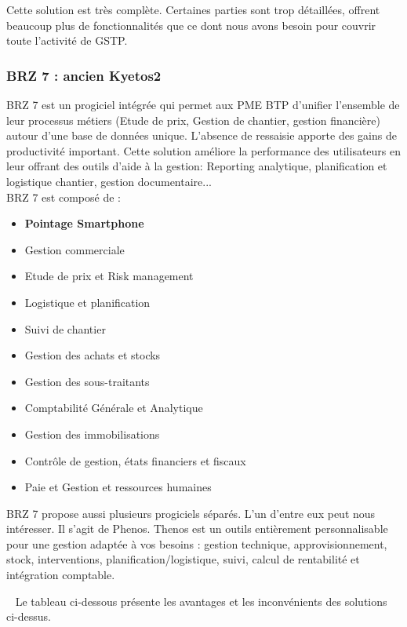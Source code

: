 		Cette solution est très complète. Certaines parties sont trop détaillées, offrent beaucoup plus de fonctionnalités que ce dont nous avons besoin pour couvrir toute l'activité de GSTP.
			
		\subsubsection{BRZ 7 : ancien Kyetos2}
		
		BRZ 7 est un progiciel intégrée qui permet aux PME BTP d'unifier l'ensemble de leur processus métiers (Etude de prix, Gestion de chantier, gestion financière) autour d'une base de données unique. 
    L'absence de ressaisie apporte des gains de productivité important. 
    Cette solution améliore la performance des utilisateurs en leur offrant des outils d'aide à la gestion: Reporting analytique, 
    planification et logistique chantier, gestion documentaire...\\ 
		BRZ 7 est composé de :
 		
     \begin{itemize}
		  \item \textbf{Pointage Smartphone}
		  \item Gestion commerciale
		  \item Etude de prix et Risk management
		  \item Logistique et planification
		  \item Suivi de chantier
		  \item Gestion des achats et stocks
		  \item Gestion des sous-traitants
		  \item Comptabilité Générale et Analytique
		  \item Gestion des immobilisations
		  \item Contrôle de gestion, états financiers et fiscaux
		  \item Paie et Gestion et ressources humaines\\
		\end{itemize}
		
		BRZ 7 propose aussi plusieurs progiciels séparés. L'un d'entre eux peut nous intéresser. Il s'agit de Phenos.
    Thenos est un outils entièrement personnalisable pour une gestion adaptée à vos besoins : 
    gestion technique, approvisionnement, stock, interventions, planification/logistique, suivi, calcul de rentabilité et intégration comptable. 
		  
		

~\newline
Le tableau ci-dessous présente les avantages et les inconvénients des solutions ci-dessus.
~\newline

